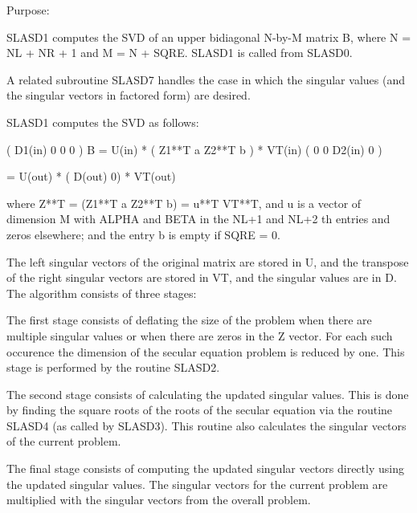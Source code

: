  \begin{DoxyParagraph}{Purpose\+: }
\begin{DoxyVerb} SLASD1 computes the SVD of an upper bidiagonal N-by-M matrix B,
 where N = NL + NR + 1 and M = N + SQRE. SLASD1 is called from SLASD0.

 A related subroutine SLASD7 handles the case in which the singular
 values (and the singular vectors in factored form) are desired.

 SLASD1 computes the SVD as follows:

               ( D1(in)    0    0       0 )
   B = U(in) * (   Z1**T   a   Z2**T    b ) * VT(in)
               (   0       0   D2(in)   0 )

     = U(out) * ( D(out) 0) * VT(out)

 where Z**T = (Z1**T a Z2**T b) = u**T VT**T, and u is a vector of dimension M
 with ALPHA and BETA in the NL+1 and NL+2 th entries and zeros
 elsewhere; and the entry b is empty if SQRE = 0.

 The left singular vectors of the original matrix are stored in U, and
 the transpose of the right singular vectors are stored in VT, and the
 singular values are in D.  The algorithm consists of three stages:

    The first stage consists of deflating the size of the problem
    when there are multiple singular values or when there are zeros in
    the Z vector.  For each such occurence the dimension of the
    secular equation problem is reduced by one.  This stage is
    performed by the routine SLASD2.

    The second stage consists of calculating the updated
    singular values. This is done by finding the square roots of the
    roots of the secular equation via the routine SLASD4 (as called
    by SLASD3). This routine also calculates the singular vectors of
    the current problem.

    The final stage consists of computing the updated singular vectors
    directly using the updated singular values.  The singular vectors
    for the current problem are multiplied with the singular vectors
    from the overall problem.\end{DoxyVerb}
 
\end{DoxyParagraph}

